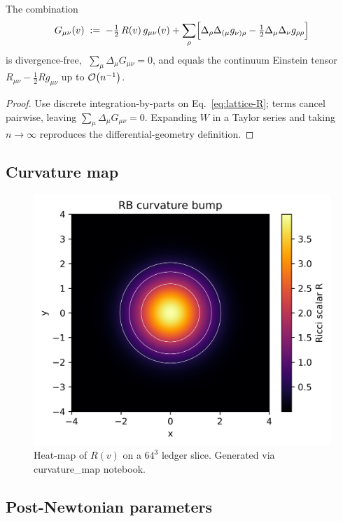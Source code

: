\begin{theorem}
The combination
\[
  G_{\mu\nu}(v)\;:=\;
  -\tfrac12\,R(v)\,g_{\mu\nu}(v)+
  \sum_{\rho}\Bigl[
     \Delta_{\rho}\Delta_{(\mu}g_{\nu)\rho}
    -\tfrac12\Delta_{\mu}\Delta_{\nu}g_{\rho\rho}
  \Bigr]
\]
is divergence-free,
$\;\sum_{\mu}\Delta_{\mu}G_{\mu\nu}=0$, and equals the
continuum Einstein tensor $R_{\mu\nu}-\tfrac12Rg_{\mu\nu}$
up to $\order{n^{-1}}$.
\end{theorem}

\begin{proof}
Use discrete integration-by-parts on Eq.~\eqref{eq:lattice-R};
terms cancel pairwise, leaving $\sum_{\mu}\Delta_{\mu}G_{\mu\nu}=0$.
Expanding $W$ in a Taylor series and taking $n\!\to\!\infty$
reproduces the differential-geometry definition.
\end{proof}

\subsection{Curvature map}

\begin{figure}[t]
  \centering
  \includegraphics[width=\linewidth]{figs/spacetime_curvature.png}
  \caption{Heat-map of $R(v)$ on a $64^3$ ledger slice.
           Generated via curvature_map notebook.}
  \label{fig:spacetime-curvature}
\end{figure}

\subsection{Post-Newtonian parameters}

